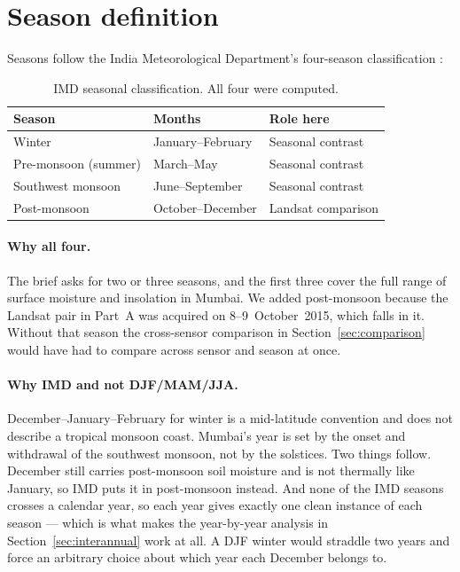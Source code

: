 \documentclass[11pt,a4paper]{article}
\begin{document}
\section{Season definition}

Seasons follow the India Meteorological Department's four-season
classification \citep{imd_seasons}:

\begin{table}[htbp]
\centering
\begin{tabular}{lll}
\toprule
\textbf{Season} & \textbf{Months} & \textbf{Role here} \\
\midrule
Winter                & January--February  & Seasonal contrast \\
Pre-monsoon (summer)  & March--May         & Seasonal contrast \\
Southwest monsoon     & June--September    & Seasonal contrast \\
Post-monsoon          & October--December  & Landsat comparison \\
\bottomrule
\end{tabular}
\caption{IMD seasonal classification. All four were computed.}
\label{tab:seasons}
\end{table}

\paragraph{Why all four.}
The brief asks for two or three seasons, and the first three cover the
full range of surface moisture and insolation in Mumbai. We added
post-monsoon because the Landsat pair in Part~A was acquired on
8--9~October~2015, which falls in it. Without that season the
cross-sensor comparison in Section~\ref{sec:comparison} would have had
to compare across sensor and season at once.

\paragraph{Why IMD and not DJF/MAM/JJA.}
December--January--February for winter is a mid-latitude convention
and does not describe a tropical monsoon coast. Mumbai's year is set
by the onset and withdrawal of the southwest monsoon, not by the
solstices. Two things follow. December still carries post-monsoon soil
moisture and is not thermally like January, so IMD puts it in
post-monsoon instead. And none of the IMD seasons crosses a calendar
year, so each year gives exactly one clean instance of each season ---
which is what makes the year-by-year analysis in
Section~\ref{sec:interannual} work at all. A DJF winter would straddle
two years and force an arbitrary choice about which year each December
belongs to.
\end{document}

